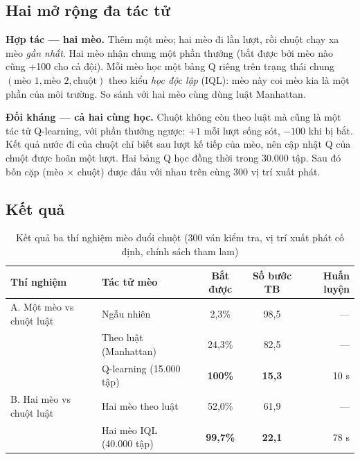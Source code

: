 \subsection{Hai mở rộng đa tác tử}

\textbf{Hợp tác — hai mèo.} Thêm một mèo; hai mèo đi lần lượt, rồi chuột chạy xa mèo \emph{gần nhất}. Hai mèo nhận chung một phần thưởng (bắt được bởi mèo nào cũng +100 cho cả đội). Mỗi mèo học một bảng Q riêng trên trạng thái chung $(\text{mèo 1},\text{mèo 2},\text{chuột})$ theo kiểu \emph{học độc lập} (IQL): mèo này coi mèo kia là một phần của môi trường. So sánh với hai mèo cùng dùng luật Manhattan.

\textbf{Đối kháng — cả hai cùng học.} Chuột không còn theo luật mà cũng là một tác tử Q-learning, với phần thưởng ngược: $+1$ mỗi lượt sống sót, $-100$ khi bị bắt. Kết quả nước đi của chuột chỉ biết sau lượt kế tiếp của mèo, nên cập nhật Q của chuột được hoãn một lượt. Hai bảng Q học đồng thời trong 30.000 tập. Sau đó bốn cặp (mèo × chuột) được đấu với nhau trên cùng 300 vị trí xuất phát.

\subsection{Kết quả}

\begin{table}[H]
\centering
\caption{Kết quả ba thí nghiệm mèo đuổi chuột (300 ván kiểm tra, vị trí xuất phát cố định, chính sách tham lam)}
\label{tab:ch7-catmouse}
\small
\begin{tabular}{@{}llccr@{}}
\toprule
\textbf{Thí nghiệm} & \textbf{Tác tử mèo} & \textbf{Bắt được} & \textbf{Số bước TB} & \textbf{Huấn luyện} \\
\midrule
A. Một mèo vs chuột luật & Ngẫu nhiên & 2,3\% & 98,5 & — \\
 & Theo luật (Manhattan) & 24,3\% & 82,5 & — \\
 & Q-learning (15.000 tập) & \textbf{100\%} & \textbf{15,3} & 10 s \\
\midrule
B. Hai mèo vs chuột luật & Hai mèo theo luật & 52,0\% & 61,9 & — \\
 & Hai mèo IQL (40.000 tập) & \textbf{99,7\%} & \textbf{22,1} & 78 s \\
\bottomrule
\end{tabular}
\end{table}


